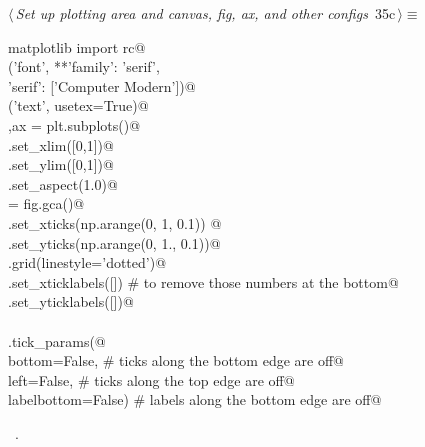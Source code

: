 \documentclass[11.5pt]{report}
\begin{document}
\vspace{-0.8cm}\newchunk 
\begin{flushleft} \small\label{scrap31}\raggedright\small
{} $\langle\,${\itshape Set up plotting area and canvas, fig, ax, and other configs}\nobreak\ {\footnotesize {35c}}$\,\rangle\equiv$
\vspace{-1ex}
\begin{list}{}{} \item
\mbox{}\verb@from matplotlib import rc@\\
\mbox{}\verb@rc('font', **{'family': 'serif', \@\\
\mbox{}\verb@           'serif': ['Computer Modern']})@\\
\mbox{}\verb@rc('text', usetex=True)@\\
\mbox{}\verb@fig,ax = plt.subplots()@\\
\mbox{}\verb@ax.set_xlim([0,1])@\\
\mbox{}\verb@ax.set_ylim([0,1])@\\
\mbox{}\verb@ax.set_aspect(1.0)@\\
\mbox{}\verb@ax = fig.gca()@\\
\mbox{}\verb@ax.set_xticks(np.arange(0, 1, 0.1))     @\\
\mbox{}\verb@ax.set_yticks(np.arange(0, 1., 0.1))@\\
\mbox{}\verb@plt.grid(linestyle='dotted')@\\
\mbox{}\verb@ax.set_xticklabels([]) # to remove those numbers at the bottom@\\
\mbox{}\verb@ax.set_yticklabels([])@\\
\mbox{}\verb@@\\
\mbox{}\verb@ax.tick_params(@\\
\mbox{}\verb@    bottom=False,      # ticks along the bottom edge are off@\\
\mbox{}\verb@    left=False,        # ticks along the top edge are off@\\
\mbox{}\verb@    labelbottom=False) # labels along the bottom edge are off@\\
\mbox{}\verb@@{\NWsep}
\end{list}
\vspace{-1.5ex}
\footnotesize
\begin{list}{}{\setlength{\itemsep}{-\parsep}\setlength{\itemindent}{-\leftmargin}}
\item \NWtxtMacroRefIn\ .

\item{}
\end{list}
\vspace{4ex}
\end{flushleft}
\end{document}
